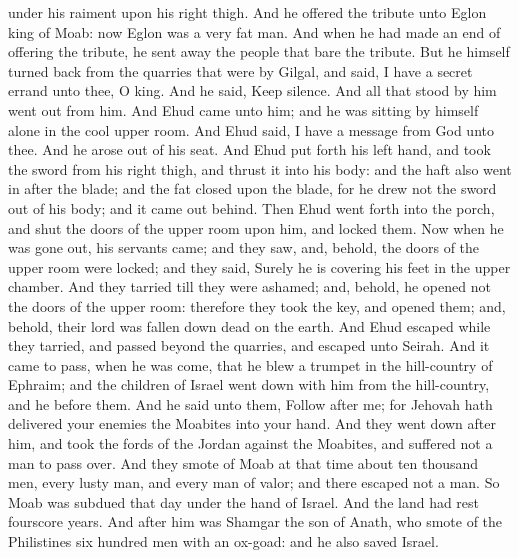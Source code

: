 under his raiment upon his right thigh. And he offered the tribute unto Eglon king of Moab: now Eglon was a very fat man. And when he had made an end of offering the tribute, he sent away the people that bare the tribute. But he himself turned back from the quarries that were by Gilgal, and said, I have a secret errand unto thee, O king. And he said, Keep silence. And all that stood by him went out from him. And Ehud came unto him; and he was sitting by himself alone in the cool upper room. And Ehud said, I have a message from God unto thee. And he arose out of his seat. And Ehud put forth his left hand, and took the sword from his right thigh, and thrust it into his body: and the haft also went in after the blade; and the fat closed upon the blade, for he drew not the sword out of his body; and it came out behind. Then Ehud went forth into the porch, and shut the doors of the upper room upon him, and locked them.  Now when he was gone out, his servants came; and they saw, and, behold, the doors of the upper room were locked; and they said, Surely he is covering his feet in the upper chamber. And they tarried till they were ashamed; and, behold, he opened not the doors of the upper room: therefore they took the key, and opened them; and, behold, their lord was fallen down dead on the earth.  And Ehud escaped while they tarried, and passed beyond the quarries, and escaped unto Seirah. And it came to pass, when he was come, that he blew a trumpet in the hill-country of Ephraim; and the children of Israel went down with him from the hill-country, and he before them. And he said unto them, Follow after me; for Jehovah hath delivered your enemies the Moabites into your hand. And they went down after him, and took the fords of the Jordan against the Moabites, and suffered not a man to pass over. And they smote of Moab at that time about ten thousand men, every lusty man, and every man of valor; and there escaped not a man. So Moab was subdued that day under the hand of Israel. And the land had rest fourscore years.  And after him was Shamgar the son of Anath, who smote of the Philistines six hundred men with an ox-goad: and he also saved Israel. 

